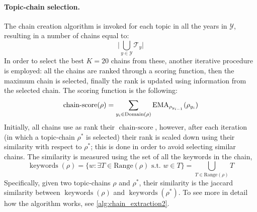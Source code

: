 \paragraph{\textbf{Topic-chain selection.}} The chain creation algorithm is invoked for each topic in all the years in $\mathcal Y$, resulting in a number of chains equal to:
$$
\Big|\bigcup_{y\in\mathcal Y}\mathcal T_y\Big|
$$
In order to select the best $K=20$ chains from these, another iterative procedure is employed: all the chains are ranked through a scoring function, then the maximum chain is selected, finally the rank is updated using information from the selected chain.
The scoring function is the following:  
\newcommand{\ChainScore}{\mathop{\mathrm{chain\text{-}score}}}
\newcommand{\keywords}{\mathop{\mathrm{keywords}}}
\[
\ChainScore(\rho) = \sum _{y_i\in \mathrm{Domain(\rho)}}\EMA_{\rho_{y_{i-1}}}(\rho_{y_i})
\]
Initially, all chains use as rank their $\ChainScore$, however, after each iteration (in which a topic-chain $\rho^*$ is selected) their rank is scaled down using their similarity with respect to $\rho^*$; this is done in order to avoid selecting similar chains.
The similarity is measured using the set of all the keywords in the chain,
$$
	\keywords(\rho) =\{w:\exists T\in \mathrm{Range}(\rho) \text{  s.t. } w\in T\} =  \bigcup_{T\in\mathrm{Range}(\rho)} T
$$
Specifically, given two topic-chains $\rho$ and $\rho^*$, their similarity is the jaccard similarity between  $\keywords(\rho)$ and $\keywords(\rho^*)$. To see more in detail how the algorithm works, see \cref{alg:chain_extraction2}.

